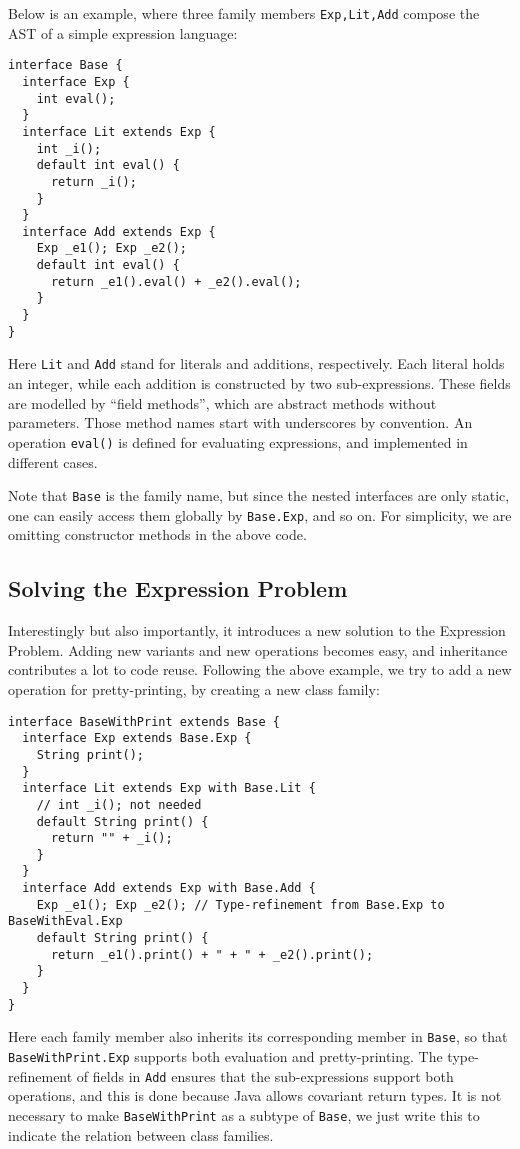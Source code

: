 Below is an example, where
three family members \lstinline|Exp,Lit,Add| compose the AST of a simple expression language:

\begin{lstlisting}
interface Base {
  interface Exp {
    int eval();
  }
  interface Lit extends Exp {
    int _i();
    default int eval() {
      return _i();
    }
  }
  interface Add extends Exp {
    Exp _e1(); Exp _e2();
    default int eval() {
      return _e1().eval() + _e2().eval();
    }
  }
}
\end{lstlisting}
Here  \lstinline|Lit| and \lstinline|Add|
stand for literals and additions, respectively. Each literal holds an integer, while each addition is constructed by
two sub-expressions. These fields are modelled by ``field methods'', which are abstract methods without parameters. Those
method names start with underscores by convention. An operation \lstinline|eval()| is defined for evaluating expressions,
and implemented in different cases.

Note that \lstinline|Base| is the family name, but since the nested interfaces are only static, one
can easily access them globally by \lstinline|Base.Exp|, and so on. For simplicity, we are omitting constructor methods
in the above code.

\subsection{Solving the Expression Problem}

Interestingly but also importantly, it introduces a new solution to the Expression Problem. Adding new variants and new operations
becomes easy, and inheritance contributes a lot to code reuse. Following the above example, we try to add a new operation for pretty-printing,
by creating a new class family:

\begin{lstlisting}
interface BaseWithPrint extends Base {
  interface Exp extends Base.Exp {
    String print();
  }
  interface Lit extends Exp with Base.Lit {
    // int _i(); not needed
    default String print() {
      return "" + _i();
    }
  }
  interface Add extends Exp with Base.Add {
    Exp _e1(); Exp _e2(); // Type-refinement from Base.Exp to BaseWithEval.Exp
    default String print() {
      return _e1().print() + " + " + _e2().print();
    }
  }
}
\end{lstlisting}
Here each family member also inherits its corresponding member in \lstinline|Base|, so that \lstinline|BaseWithPrint.Exp|
supports both evaluation and pretty-printing. The type-refinement of fields in \lstinline|Add| ensures that the sub-expressions
support both operations, and this is done because Java allows covariant return types.
It is not necessary to make \lstinline|BaseWithPrint| as a subtype of
\lstinline|Base|, we just write this to indicate the relation between class families.

